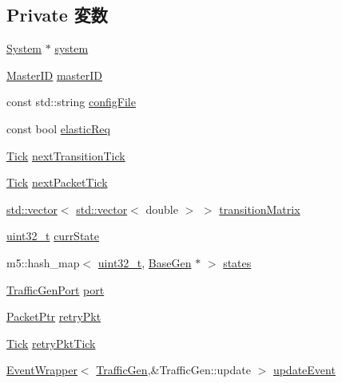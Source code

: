 \subsection*{Private 変数}
\begin{DoxyCompactItemize}
\item 
\hyperlink{classSystem}{System} $\ast$ \hyperlink{classTrafficGen_af27ccd765f13a4b7bd119dc7579e2746}{system}
\item 
\hyperlink{request_8hh_ac366b729262fd8e7cbd3283da6f775cf}{MasterID} \hyperlink{classTrafficGen_aa8528db52f6eb976baecb2291d1b408a}{masterID}
\item 
const std::string \hyperlink{classTrafficGen_ad5835f1d2646493dafb2c5ac6244a93f}{configFile}
\item 
const bool \hyperlink{classTrafficGen_a42af28607a09ff1b95b5e848bf73f915}{elasticReq}
\item 
\hyperlink{base_2types_8hh_a5c8ed81b7d238c9083e1037ba6d61643}{Tick} \hyperlink{classTrafficGen_aaa2a440da39850c0d2d678fd2ee844af}{nextTransitionTick}
\item 
\hyperlink{base_2types_8hh_a5c8ed81b7d238c9083e1037ba6d61643}{Tick} \hyperlink{classTrafficGen_a52d98e2f5ed0bf508db823995ad4940f}{nextPacketTick}
\item 
\hyperlink{classstd_1_1vector}{std::vector}$<$ \hyperlink{classstd_1_1vector}{std::vector}$<$ double $>$ $>$ \hyperlink{classTrafficGen_a14f30e68ecada24867b46bcc8093f4f5}{transitionMatrix}
\item 
\hyperlink{Type_8hh_a435d1572bf3f880d55459d9805097f62}{uint32\_\-t} \hyperlink{classTrafficGen_a8428fe009627d1dd49ef98a54587830e}{currState}
\item 
m5::hash\_\-map$<$ \hyperlink{Type_8hh_a435d1572bf3f880d55459d9805097f62}{uint32\_\-t}, \hyperlink{classBaseGen}{BaseGen} $\ast$ $>$ \hyperlink{classTrafficGen_a033c23b252da5264e1f864277711e5e1}{states}
\item 
\hyperlink{classTrafficGen_1_1TrafficGenPort}{TrafficGenPort} \hyperlink{classTrafficGen_a51d5c08451d2b2b8b99fe3fda83f05d8}{port}
\item 
\hyperlink{classPacket}{PacketPtr} \hyperlink{classTrafficGen_a314ae93c04b3ca96e79e1b1f39a8e478}{retryPkt}
\item 
\hyperlink{base_2types_8hh_a5c8ed81b7d238c9083e1037ba6d61643}{Tick} \hyperlink{classTrafficGen_a770dcab4388a8d55911cb6f29d9bb692}{retryPktTick}
\item 
\hyperlink{classEventWrapper}{EventWrapper}$<$ \hyperlink{classTrafficGen_1_1TrafficGen}{TrafficGen},\&TrafficGen::update $>$ \hyperlink{classTrafficGen_ab779474477fa217dd5483711dec2bf13}{updateEvent}

\end{DoxyCompactItemize}
